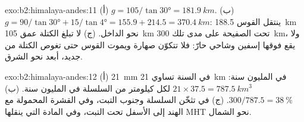 \begin{solution}{exo:b2:himalaya-andes:11}
(أ) $g = 105/\tan\ang{30} = \qty{181.9}{km}$. (ب) $g = 90/\tan\ang{30} + 15/\tan\ang{4} =
155.9 + 214.5 = \qty{370.4}{km}$: ينتقل القوس \qty{188.5}{km} نحو الداخل. (ج) لا تبلغ الكتلة
عمق \qty{105}{km} تحت الصفيحة على مدى تلك \qty{300}{km}، ولا يقع فوقها إسفين وشاحي حارّ:
فلا تتكوّن صهارة ويموت القوس حتى تغوص الكتلة من جديد، أبعد نحو الشرق.
\end{solution}

\begin{solution}{exo:b2:himalaya-andes:12}
(أ) \qty{21}{mm} في السنة تساوي \qty{21}{km} في المليون سنة: $21\times37.5 =
\qty{787.5}{km^3}$ لكل كيلومتر من السلسلة في المليون سنة. (ب) $300/787.5 =
\qty{38}{\percent}$. (ج) في تثخّن السلسلة وجنوب التبت، وفي القشرة
المحمولة مع الهند إلى الأسفل تحت التبت، وفي المادة التي ينقلها MHT نحو الشمال.
\end{solution}

